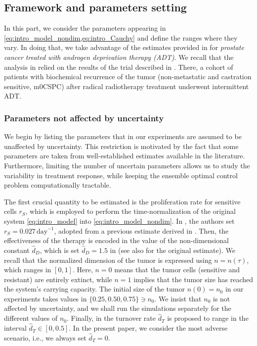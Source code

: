 \documentclass[a4paper,12pt, reqno]{amsart}
\theoremstyle{plain}
\theoremstyle{definition}
\theoremstyle{remark}
\numberwithin{equation}{section}
\begin{document}
\subsection{Framework and parameters setting} \label{subsec:param_setting}

In this part, we consider the parameters appearing in \cref{eq:intro_model_nondim,eq:intro_Cauchy} and define the ranges where they vary.
In doing that, we take advantage of the estimates provided in \cite{turnover2021} for \emph{prostate cancer treated with androgen deprivation therapy (ADT)}.
We recall that the analysis in \cite{turnover2021} relied on the results of the trial described in \cite{bruchovsky2006final}. There, a cohort of patients with biochemical recurrence of the tumor (non-metastatic and castration sensitive, m0CSPC) after radical radiotherapy treatment underwent intermittent ADT.


\subsubsection*{Parameters not affected by uncertainty} 
We begin by listing the parameters that in our experiments {are assumed to be unaffected by uncertainty}. {This restriction is motivated by the fact that some parameters are taken from well-established estimates available in the literature. Furthermore, limiting the number of uncertain parameters allows us to study the variability in treatment response, while keeping the ensemble optimal control problem computationally tractable.}

The first crucial quantity to be estimated is the proliferation rate for sensitive cells $r_S$, which is employed to perform the time-normalization of the original system \eqref{eq:intro_model} into \eqref{eq:intro_model_nondim}.
In \cite{turnover2021}, the authors set $r_S=0.027\, \mathrm{day}^{-1}$, adopted from a previous estimate derived in \cite{moff2017zhang}.
Then, the effectiveness of the therapy is encoded in the value of the non-dimensional constant $\hat d_D$, which is set $\hat d_D=1.5$ in \cite{turnover2021} (see also \cite{moff2019multidrug} for the original estimate). 
We recall that the normalized dimension of the tumor is expressed using $n=n(\tau)$, which ranges in $[0,1]$. Here, $n=0$ means that the tumor cells (sensitive and resistant) are entirely extinct, while $n=1$ implies that the tumor size has reached the system's carrying capacity.
The initial size of the tumor $n(0)=n_0$ in our experiments takes values in $\{0.25, 0.50, 0.75\}\ni n_0$. We insist that $n_0$ is not affected by uncertainty, and we shall run the simulations separately for the different values of $n_0$.
Finally, in \cite{turnover2021} the turnover rate $\hat d_T$ is proposed to range in the interval $\hat d_T\in [0,0.5]$. In the present paper, we consider the most adverse scenario, i.e., we always set $\hat d_T=0$. 
\end{document}
